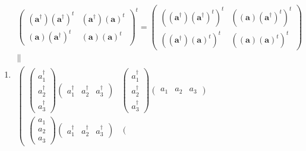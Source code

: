 \documentclass[aps,preprint]{revtex4}
\begin{document}
\begin{enumerate}
\begin{enumerate}
\begin{enumerate}
\item 
\begin{gather}
\left( 
\begin{array}{cc}
\left( \mathbf{a}^{\dagger }\right) \left( \mathbf{a}^{\dagger }\right) ^{t}
& \left( \mathbf{a}^{\dagger }\right) \left( \mathbf{a}\right) ^{t} \\ 
\left( \mathbf{a}\right) \left( \mathbf{a}^{\dagger }\right) ^{t} & \left( 
\mathbf{a}\right) \left( \mathbf{a}\right) ^{t}%
\end{array}%
\right) ^{t}=\left( 
\begin{array}{cc}
\left( \left( \mathbf{a}^{\dagger }\right) \left( \mathbf{a}^{\dagger
}\right) ^{t}\right) ^{t} & \left( \left( \mathbf{a}\right) \left( \mathbf{a}%
^{\dagger }\right) ^{t}\right) ^{t} \\ 
\left( \left( \mathbf{a}^{\dagger }\right) \left( \mathbf{a}\right)
^{t}\right) ^{t} & \left( \left( \mathbf{a}\right) \left( \mathbf{a}\right)
^{t}\right) ^{t}%
\end{array}%
\right) \\
\parallel \\
\left( 
\begin{array}{cc}
\left( 
\begin{array}{c}
a_{1}^{\dagger } \\ 
a_{2}^{\dagger } \\ 
a_{3}^{\dagger }%
\end{array}%
\right) \left( 
\begin{array}{ccc}
a_{1}^{\dagger } & a_{2}^{\dagger } & a_{3}^{\dagger }%
\end{array}%
\right) & \left( 
\begin{array}{c}
a_{1}^{\dagger } \\ 
a_{2}^{\dagger } \\ 
a_{3}^{\dagger }%
\end{array}%
\right) \left( 
\begin{array}{ccc}
a_{1} & a_{2} & a_{3}%
\end{array}%
\right) \\ 
\left( 
\begin{array}{c}
a_{1} \\ 
a_{2} \\ 
a_{3}%
\end{array}%
\right) \left( 
\begin{array}{ccc}
a_{1}^{\dagger } & a_{2}^{\dagger } & a_{3}^{\dagger }%
\end{array}%
\right) & \left( 
\begin{array}{c}

\end{array}
\end{array}
\end{gather}
\end{enumerate}
\end{enumerate}
\end{enumerate}
\end{document}
